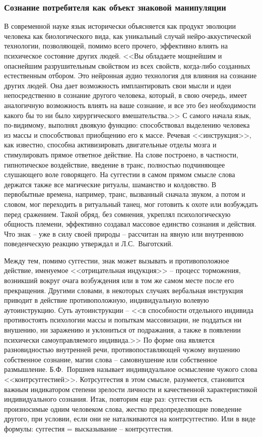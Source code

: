 \subsubsection{Сознание потребителя как объект знаковой манипуляции}
\label{2.3}
В современной науке язык исторически объясняется как продукт эволюции
человека как биологического вида, как уникальный случай нейро-аккустической технологии,
позволяющей, помимо всего прочего, эффективно влиять на психическое состояние
других людей. <<Вы обладаете  мощнейшим и опаснейшим разрушительным свойством из всех свойств, когда-либо  созданных естественным отбором. Это нейронная аудио технология для влияния на сознание других людей. Она дает возможность имплантировать свои мысли и идеи непосредственно в сознание другого человека, который, в свою очередь, имеет аналогичную  возможность  влиять на ваше сознание, и все это без необходимости какого бы то ни было хирургического вмешательства.>>\autocite{pagel2012wired}
С самого начала язык, по-видимому, выполнял двоякую функцию: способствовал выделению
человека из массы и способствовал приобщению его к массе. Речевая <<инструкция>>,
как известно, способна активизировать двигательные отделы мозга и стимулировать
прямое ответное действие. На слове построено, в частности, гипнотическое воздействие,
введение в транс, полностью подчиняющее слушающего воле говорящего. На суггестии
в самом прямом смысле слова держатся также все магические ритуалы, шаманство и
колдовство. В первобытные времена, например, транс, вызванный сначала звуком,
а потом и словом, мог переходить в ритуальный танец, мог готовить к охоте или
возбуждать перед сражением.\autocite{porshnev1974} Такой обряд, без сомнения,
укреплял психологическую общность племени, эффективно создавал массовое единство
сознания и действия. Что знак -- уже в силу своей природы -- рассчитан на явную или
внутреннюю поведенческую реакцию утверждал и Л.С.~Выготский.\autocite[][179]{vigotsky1956}

Между тем, помимо суггестии, знак может вызывать и противоположное действие,
именуемое <<отрицательная индукция>> -- процесс торможения, возникший вокруг очага
возбуждения или в том же самом месте после его прекращения. Другими словами,
в некоторых случаях вербальная инструкция приводит в действие противоположную,
индивидуальную волевую аутоинструкцию. Суть аутоинструкции -- <<в способности
отдельного индивида противостоять психологии массы и попыткам массовизации,
не поддаться ни внушению, ни заражению и уклониться от подражания, а также в
появлении психически самоуправляемого индивида.>>\autocite[][96]{olshansky}
По форме она является разновидностью внутренней речи, противопоставляющей чужому
внушению собственное сознание, магии слова -- самовнушение или собственное размышление.
Б.Ф.~Поршнев называет индивидуальное осмысление чужого слова <<контрсуггестией>>.\autocite{porshnev1974}
Котрсуггестия в этом смысле, разумеется, становится важным индикатором степени
зрелости личности и качественной характеристикой индивидуального сознания.
Итак, повторим еще раз: суггестия есть произносимые одним человеком слова,
жестко предопределяющие поведение другого, при условии, если они не наталкиваются
на контрсуггестию. Или в виде формулы: суггестия = высказывание -- контрсуггестия.

